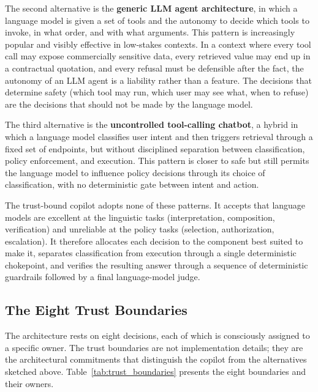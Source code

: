 The second alternative is the \textbf{generic LLM agent architecture}, in which a language model is given a set of tools and the autonomy to decide which tools to invoke, in what order, and with what arguments. This pattern is increasingly popular and visibly effective in low-stakes contexts. In a context where every tool call may expose commercially sensitive data, every retrieved value may end up in a contractual quotation, and every refusal must be defensible after the fact, the autonomy of an LLM agent is a liability rather than a feature. The decisions that determine safety (which tool may run, which user may see what, when to refuse) are the decisions that should not be made by the language model.

The third alternative is the \textbf{uncontrolled tool-calling chatbot}, a hybrid in which a language model classifies user intent and then triggers retrieval through a fixed set of endpoints, but without disciplined separation between classification, policy enforcement, and execution. This pattern is closer to safe but still permits the language model to influence policy decisions through its choice of classification, with no deterministic gate between intent and action.

The trust-bound copilot adopts none of these patterns. It accepts that language models are excellent at the linguistic tasks (interpretation, composition, verification) and unreliable at the policy tasks (selection, authorization, escalation). It therefore allocates each decision to the component best suited to make it, separates classification from execution through a single deterministic chokepoint, and verifies the resulting answer through a sequence of deterministic guardrails followed by a final language-model judge.

\subsection*{The Eight Trust Boundaries}
The architecture rests on eight decisions, each of which is consciously assigned to a specific owner. The trust boundaries are not implementation details; they are the architectural commitments that distinguish the copilot from the alternatives sketched above. Table~\ref{tab:trust_boundaries} presents the eight boundaries and their owners.

